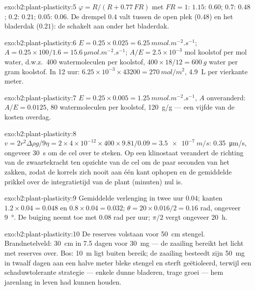 \begin{solution}{exo:b2:plant-plasticity:5}
$\varphi = R/(R + 0.77\,FR)$ met $FR = 1$: $1.15$: $0.60$; $0.7$:
$0.48$; $0.2$: $0.21$; $0.05$: $0.06$. De drempel $0.4$ valt tussen de
open plek ($0.48$) en het bladerdak ($0.21$): de  schakelt
aan onder het bladerdak.
\end{solution}

\begin{solution}{exo:b2:plant-plasticity:6}
$E = 0.25\times 0.025 = \qty{6.25}{mmol.m^{-2}.s^{-1}}$; $A =
0.25\times 100/1.6 = \qty{15.6}{\micro mol.m^{-2}.s^{-1}}$; $A/E =
2.5\times 10^{-3}$ mol koolstof per mol water, d.w.z.\ 400 watermoleculen
per koolstof, $400\times 18/12 = \qty{600}{g}$ water per gram koolstof. In
12 uur: $6.25\times 10^{-3}\times 43200 =
\qty{270}{mol/m^2}$, \qty{4.9}{L} per vierkante meter.
\end{solution}

\begin{solution}{exo:b2:plant-plasticity:7}
$E = 0.25\times 0.005 = \qty{1.25}{mmol.m^{-2}.s^{-1}}$, $A$
onveranderd: $A/E = 0.0125$, 80 watermoleculen per koolstof,
\qty{120}{g/g} --- een vijfde van de kosten overdag.
\end{solution}

\begin{solution}{exo:b2:plant-plasticity:8}
$v = 2r^{2}\Delta\rho g/9\eta = 2\times 4\times 10^{-12}\times
400\times 9.81/0.09 = \qty{3.5e-7}{m/s}$: \qty{0.35}{\micro m/s}, ongeveer
\qty{30}{s} om de cel over te steken. Op een klinostaat verandert de
richting van de zwaartekracht ten opzichte van de cel om de paar seconden
van het zakken, zodat de korrels zich nooit aan één kant ophopen en de
gemiddelde prikkel over de integratietijd van de plant (minuten) nul is.
\end{solution}

\begin{solution}{exo:b2:plant-plasticity:9}
Gemiddelde verlenging in twee uur $0.04$; kanten $1.2\times 0.04 = 0.048$
en $0.8\times 0.04 = 0.032$; $\theta = 20\times 0.016/2 = 0.16$
rad, ongeveer \qty{9}{\degree}. De buiging neemt toe met $0.08$ rad per uur;
$\pi/2$ vergt ongeveer \qty{20}{h}.
\end{solution}

\begin{solution}{exo:b2:plant-plasticity:10}
De reserves volstaan voor \qty{50}{cm} stengel. Brandnetelveld:
\qty{30}{cm} in 7.5 dagen voor \qty{30}{mg} --- de zaailing bereikt het licht
met reserves over. Bos: \qty{10}{m} ligt buiten bereik; de zaailing besteedt
zijn \qty{50}{mg} in twaalf dagen aan een halve meter bleke stengel en sterft
geëtioleerd, terwijl een schaduwtolerante strategie --- enkele dunne
bladeren, trage groei --- hem jarenlang in leven had kunnen houden.
\end{solution}

